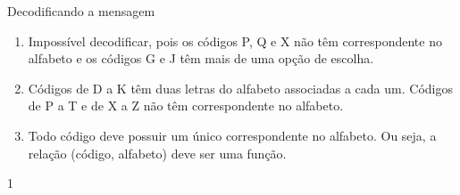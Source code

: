 \begin{answer}{Decodificando a mensagem}
{\begin{enumerate}
Para valores maiores que $26$ devemos subtrair $26$ sucessivamente até encontrar um valor positivo menor que ou igual a $26$ e então encontrar a letra correspondente. Isso equivale a tomar o resto da divisão por $26$.


\item Impossível decodificar, pois os códigos P, Q e X não têm correspondente no alfabeto e os códigos G e J têm mais de uma opção de escolha.

\item Códigos de D a K têm duas letras do alfabeto associadas a cada um. Códigos de P a T e de X a Z não têm correspondente no alfabeto.

\item Todo código deve possuir um único correspondente no alfabeto. Ou seja, a relação (código, alfabeto) deve ser uma função.

\end{enumerate}
}{1}
\end{answer}

\know{}
\label{\detokenize{AF106-A::doc}}\label{\detokenize{AF106-A:para-saber-mais}}\label{\detokenize{AF106-A:sec-aprofundando-grafico}}


